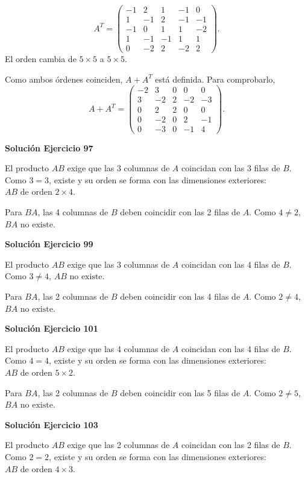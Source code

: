 \[
A^T=\begin{pmatrix}-1&2&1&-1&0\\1&-1&2&-1&-1\\-1&0&1&1&-2\\1&-1&-1&1&1\\0&-2&2&-2&2\end{pmatrix}.
\]
El orden cambia de $5\times5$ a $5\times5$.

Como ambos órdenes coinciden, $A+A^T$ está definida. Para comprobarlo,
\[
A+A^T=\begin{pmatrix}-2&3&0&0&0\\3&-2&2&-2&-3\\0&2&2&0&0\\0&-2&0&2&-1\\0&-3&0&-1&4\end{pmatrix}.
\]

\par\bigskip\noindent\textbf{Solución Ejercicio 97}\par\nobreak
El producto $AB$ exige que las 3 columnas de $A$ coincidan con las 3 filas de $B$. Como $3=3$, existe y su orden se forma con las dimensiones exteriores: $\boxed{AB\text{ de orden } 2\times 4}$.

Para $BA$, las 4 columnas de $B$ deben coincidir con las 2 filas de $A$. Como $4\neq2$, $\boxed{BA\text{ no existe}}$.


\par\bigskip\noindent\textbf{Solución Ejercicio 99}\par\nobreak
El producto $AB$ exige que las 3 columnas de $A$ coincidan con las 4 filas de $B$. Como $3\neq4$, $\boxed{AB\text{ no existe}}$.

Para $BA$, las 2 columnas de $B$ deben coincidir con las 4 filas de $A$. Como $2\neq4$, $\boxed{BA\text{ no existe}}$.


\par\bigskip\noindent\textbf{Solución Ejercicio 101}\par\nobreak
El producto $AB$ exige que las 4 columnas de $A$ coincidan con las 4 filas de $B$. Como $4=4$, existe y su orden se forma con las dimensiones exteriores: $\boxed{AB\text{ de orden } 5\times 2}$.

Para $BA$, las 2 columnas de $B$ deben coincidir con las 5 filas de $A$. Como $2\neq5$, $\boxed{BA\text{ no existe}}$.


\par\bigskip\noindent\textbf{Solución Ejercicio 103}\par\nobreak
El producto $AB$ exige que las 2 columnas de $A$ coincidan con las 2 filas de $B$. Como $2=2$, existe y su orden se forma con las dimensiones exteriores: $\boxed{AB\text{ de orden } 4\times 3}$.

